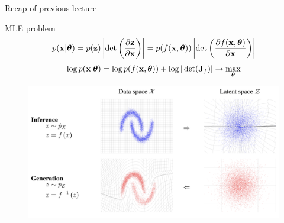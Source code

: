 

\begin{frame}
\titlepage
\end{frame}
\begin{frame}{Recap of previous lecture}
	\begin{block}{MLE problem}
		\vspace{-0.3cm}
		\[
		p(\mathbf{x}|\boldsymbol{\theta}) = p(\mathbf{z}) \left|\det \left(  \frac{\partial \mathbf{z}}{\partial \mathbf{x}} \right) \right|  = p(f(\mathbf{x}, \boldsymbol{\theta})) \left|\det \left( \frac{\partial f(\mathbf{x}, \boldsymbol{\theta})}{\partial \mathbf{x}} \right) \right|
		\]
		\[
		\log p(\mathbf{x}|\boldsymbol{\theta}) = \log p(f(\mathbf{x}, \boldsymbol{\theta})) + \log  |\det (\mathbf{J}_f) | \rightarrow \max_{\boldsymbol{\theta}}
		\]
	\end{block}
	\vspace{-0.2cm}
	\begin{figure}
		\includegraphics[width=0.85\linewidth]{figs/flows_how2}
	\end{figure}
\end{frame}
